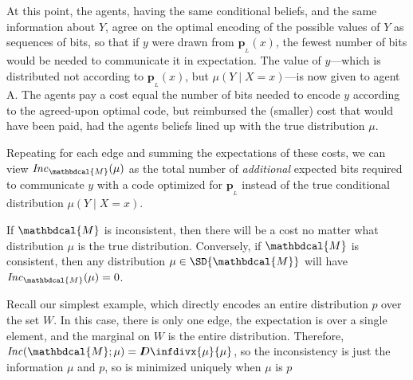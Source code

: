 \documentclass[letterpaper]{article} %
\theoremstyle{plain}
\theoremstyle{definition}
\theoremstyle{remark}
\newcommand{\thickD}{I\mkern-8muD}
\newcommand{\kldiv}{\thickD\infdivx}
\newcommand\mat[1]{\mathbf{#1}}
\newcommand{\bp}[1][L]{\mat{p}_{\!_{#1}\!}}
\newcommand{\dg}[1]{\mathbdcal{#1}}
\newcommand\Inc{\mathit{Inc}}
\begin{document}
\begin{vfull}
At this point, the agents, having the same conditional beliefs, and
the same information about $Y$, agree on the optimal encoding 
of the possible values of $Y$ as sequences of bits, so that if $y$
were drawn from $\bp(x)$, the fewest number of bits would be needed
to communicate it in expectation. The value of $y$---which is distributed
not according to $\bp(x)$, but $\mu(Y \mid X=x)$---is now given to agent A.
The agents pay a cost equal the number of bits needed to encode $y$ according
to the agreed-upon optimal code, but reimbursed the (smaller) cost that would have been paid,
had the agents beliefs lined up with the true distribution $\mu$.

Repeating for each edge and summing the expectations of these costs, we can view
$\Inc_{\dg M}(\mu)$ as the total number of \emph{additional} expected
bits required to communicate $y$ with a code optimized for
$\bp$ instead of the true conditional distribution   $\mu(Y \mid X=x)$. 

If $\dg M$ is inconsistent, then there will be a cost no matter what distribution $\mu$ is the true distribution. Conversely, if $\dg M$ is consistent, then any distribution $\mu \in \SD{\dg M}$ will have $\Inc_{\dg M}( \mu) = 0$.  
\begin{example}[continues=ex:worldsonly]
Recall our simplest example, which directly encodes an entire distribution $p$
over the set $W$. In this case, there is only one edge, the expectation is over
a single element, and the marginal on $W$ is the entire distribution. Therefore,
$\Inc(\dg M; \mu) = \kldiv{\mu}{\mu}$, so the inconsistency is just the
information $\mu$ and $p$, so is minimized uniquely when $\mu$ is $p$
\end{example}
%
\end{vfull}
	
\end{document}
